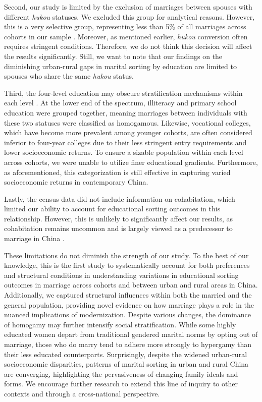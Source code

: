 Second, our study is limited by the exclusion of marriages between spouses with different \textit{hukou} statuses. We excluded this group for analytical reasons. However, this is a very selective group, representing less than 5\% of all marriages across cohorts in our sample \parencite{duTrendsEducationalAssortative2023}. Moreover, as mentioned earlier, \textit{hukou} conversion often requires stringent conditions. Therefore, we do not think this decision will affect the results significantly. Still, we want to note that our findings on the diminishing urban-rural gaps in marital sorting by education are limited to spouses who share the same \textit{hukou} status.

Third, the four-level education may obscure stratification mechanisms within each level \parencite{fengRevisitingHorizontalStratification2022}. At the lower end of the spectrum, illiteracy and primary school education were grouped together, meaning marriages between individuals with these two statuses were classified as homogamous. Likewise, vocational colleges, which have become more prevalent among younger cohorts, are often considered inferior to four-year colleges due to their less stringent entry requirements and lower socioeconomic returns. To ensure a sizable population within each level across cohorts, we were unable to utilize finer educational gradients. Furthermore, as aforementioned, this categorization is still effective in capturing varied socioeconomic returns in contemporary China.

Lastly, the census data did not include information on cohabitation, which limited our ability to account for educational sorting outcomes in this relationship. However, this is unlikely to significantly affect our results, as cohabitation remains uncommon and is largely viewed as a predecessor to marriage in China \parencite{muChangingPatternsDeterminants2022}.

These limitations do not diminish the strength of our study. To the best of our knowledge, this is the first study to systematically account for both preferences and structural conditions in understanding variations in educational sorting outcomes in marriage across cohorts and between urban and rural areas in China. Additionally, we captured structural influences within both the married and the general population, providing novel evidence on how marriage plays a role in the nuanced implications of modernization. Despite various changes, the dominance of homogamy may further intensify social stratification. While some highly educated women depart from traditional gendered marital norms by opting out of marriage, those who do marry tend to adhere more strongly to hypergamy than their less educated counterparts. Surprisingly, despite the widened urban-rural socioeconomic disparities, patterns of marital sorting in urban and rural China are converging, highlighting the pervasiveness of changing family ideals and forms. We encourage further research to extend this line of inquiry to other contexts and through a cross-national perspective.
